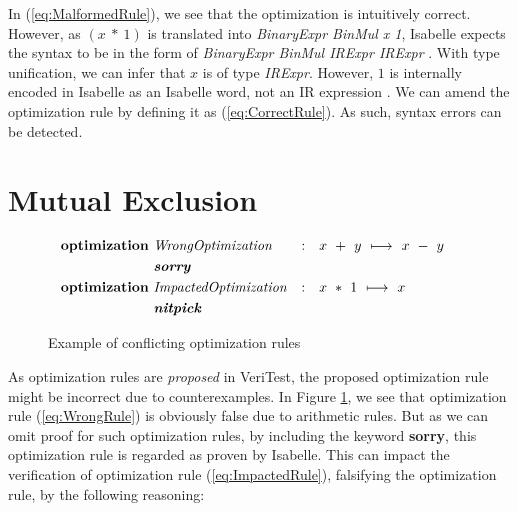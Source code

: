 In (\ref{eq:MalformedRule}), we see that the optimization is intuitively correct. However, as \((x\ *\ 1)\) is translated into 
\emph{BinaryExpr BinMul x 1}, Isabelle expects the syntax to be in the form of \emph{BinaryExpr BinMul IRExpr IRExpr} 
\cite[Definition 1]{Term_Graph_Optimizations}. With type unification, we can infer that \(x\) is of type \emph{IRExpr}. However, \(1\) is 
internally encoded in Isabelle as an Isabelle word, not an IR expression \cite[Definition 2]{Term_Graph_Optimizations}. We can amend the 
optimization rule by defining it as (\ref{eq:CorrectRule}). As such, syntax errors can be detected.

\section{Mutual Exclusion}
\label{sec:MutualExclusion}

\begin{figure}[!htb]
    \begin{alignat}{3}
        \text{\textbf{optimization} } & \text{\emph{WrongOptimization}} & : \quad & \text{\emph{\(x~+~y~\longmapsto~x~-~y\)}} & \label{eq:WrongRule} \\
        & \text{\textbf{\emph{sorry}}} & & & \nonumber \\
        \text{\textbf{optimization} } & \text{\emph{ImpactedOptimization}} & : \quad & \text{\emph{\(x~*~1~\longmapsto~x\)}} & \label{eq:ImpactedRule} \\
        & \text{\textbf{\emph{nitpick}}} & & & \nonumber
    \end{alignat}

    \caption{Example of conflicting optimization rules}
    \label{fig:conflictingRules}
\end{figure}

As optimization rules are \emph{proposed} in VeriTest, the proposed optimization rule might be incorrect due to counterexamples. In Figure 
\ref{fig:conflictingRules}, we see that optimization rule (\ref{eq:WrongRule}) is obviously false due to arithmetic rules. But as we can omit 
proof for such optimization rules, by including the keyword \textbf{sorry}, this optimization rule is regarded as proven by Isabelle. This can 
impact the verification of optimization rule (\ref{eq:ImpactedRule}), falsifying the optimization rule, by the following reasoning:

